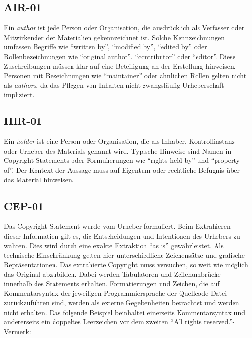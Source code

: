 \subsection{AIR-01}\label{subsec:air-01}

Ein \textit{author} ist jede Person oder Organisation, die ausdrücklich als Verfasser oder Mitwirkender der Materialien gekennzeichnet ist.
Solche Kennzeichnungen umfassen Begriffe wie \enquote{written by}, \enquote{modified by}, \enquote{edited by} oder Rollenbezeichnungen wie \enquote{original author}, \enquote{contributor} oder \enquote{editor}.
Diese Zuschreibungen müssen klar auf eine Beteiligung an der Erstellung hinweisen.
Personen mit Bezeichnungen wie \enquote{maintainer} oder ähnlichen Rollen gelten nicht als \textit{authors}, da das Pflegen von Inhalten nicht zwangsläufig Urheberschaft impliziert.


\subsection{HIR-01}\label{subsec:hir-01}

Ein \textit{holder} ist eine Person oder Organisation, die als Inhaber, Kontrollinstanz oder Urheber des Materials genannt wird.
Typische Hinweise sind Namen in Copyright-Statements oder Formulierungen wie \enquote{rights held by} und \enquote{property of}.
Der Kontext der Aussage muss auf Eigentum oder rechtliche Befugnis über das Material hinweisen.


\subsection{CEP-01}\label{subsec:cep-01}

Das Copyright Statement wurde vom Urheber formuliert.
Beim Extrahieren dieser Information gilt es, die Entscheidungen und Intentionen des Urhebers zu wahren.
Dies wird durch eine exakte Extraktion \enquote{as is} gewährleistet.
Als technische Einschränkung gelten hier unterschiedliche Zeichensätze und grafische Repräsentationen.
Das extrahierte Copyright muss versuchen, so weit wie möglich das Original abzubilden.
Dabei werden Tabulatoren und Zeilenumbrüche innerhalb des Statements erhalten.
Formatierungen und Zeichen, die auf Kommentarsyntax der jeweiligen Programmiersprache der Quellcode-Datei zurückzuführen sind, werden als externe Gegebenheiten betrachtet und werden nicht erhalten.
Das folgende Beispiel beinhaltet einerseits Kommentarsyntax und andererseits ein doppeltes Leerzeichen vor dem zweiten \enquote{All rights reserved.}-Vermerk:

